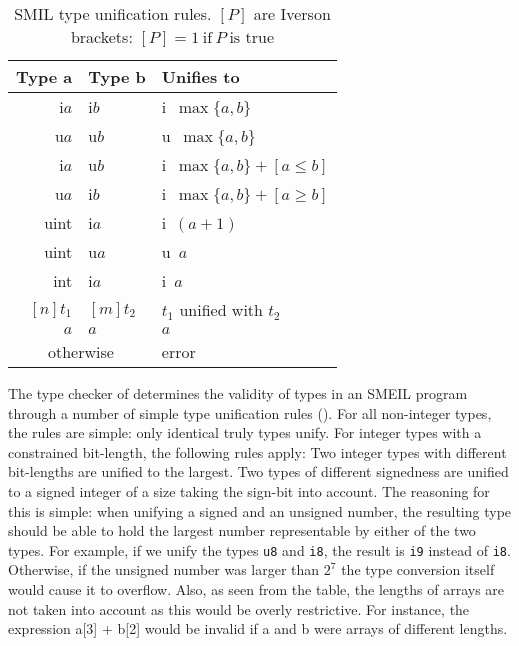 \begin{table}
  \centering
  \begin{tabular}{rll}
    \toprule
    Type a & Type b & Unifies to \\
    \midrule
    i$a$ & i$b$ & i~$\max\{a, b\}$\\
    u$a$ & u$b$ & u~$\max\{a, b\} $\\
    i$a$ & u$b$ & i~$\max\{a, b\} + [a \leq b]$\\
    u$a$ & i$b$ & i~$\max\{a, b\} + [a \geq b]$\\
    uint & i$a$ & i~$(a + 1)$\\
    uint & u$a$ & u~$a$\\
    int & i$a$ & i~$a$\\
    $[n]t_1$ & $[m]t_2$ & $t_1$ unified with $t_2$\\
    $a$ & $a$ & $a$ \\
    \multicolumn{2}{c}{otherwise} & error\\
    \bottomrule
  \end{tabular}
  \caption{SMIL type unification rules. $[P]$ are Iverson brackets:
    $[P] = 1~\text{if}~P~\text{is true}$}
  \label{tab:typeuni}
\end{table}

  

The type checker of \libsme{} determines the validity of types in an SMEIL
program through a number of simple type unification rules
(). For all non-integer types, the rules are simple: only
identical truly types unify. For integer types with a constrained bit-length,
the following rules apply: Two integer types with different bit-lengths are
unified to the largest. Two types of different signedness are unified to a
signed integer of a size taking the sign-bit into account. The reasoning for
this is simple: when unifying a signed and an unsigned number, the resulting
type should be able to hold the largest number representable by either of the
two types. For example, if we unify the types \texttt{u8} and \texttt{i8}, the
result is \texttt{i9} instead of \texttt{i8}. Otherwise, if the unsigned number
was larger than $2^7$ the type conversion itself would cause it to
overflow. Also, as seen from the table, the lengths of arrays are not taken into
account as this would be overly restrictive. For instance, the expression
{\ttfamily a[3] + b[2]} would be invalid if {\ttfamily a} and {\ttfamily b} were
arrays of different lengths.

